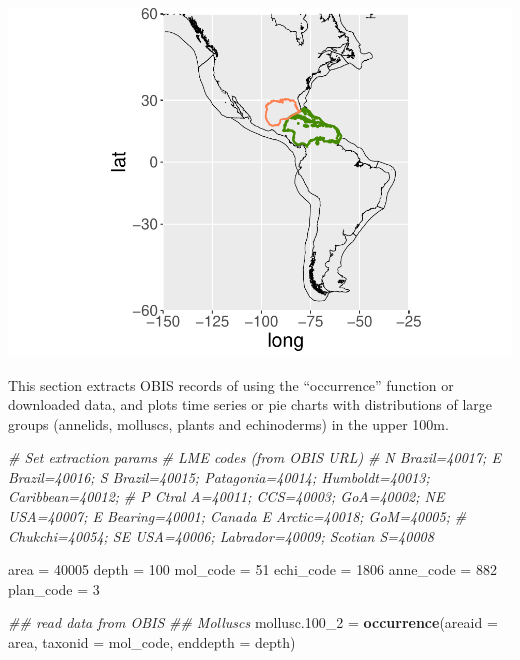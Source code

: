 \documentclass[12pt,]{article}
\newenvironment{Shaded}{\begin{snugshade}}{\end{snugshade}}
\newcommand{\CommentTok}[1]{\textcolor[rgb]{0.56,0.35,0.01}{\textit{#1}}}
\newcommand{\DataTypeTok}[1]{\textcolor[rgb]{0.13,0.29,0.53}{#1}}
\newcommand{\DecValTok}[1]{\textcolor[rgb]{0.00,0.00,0.81}{#1}}
\newcommand{\FloatTok}[1]{\textcolor[rgb]{0.00,0.00,0.81}{#1}}
\newcommand{\KeywordTok}[1]{\textcolor[rgb]{0.13,0.29,0.53}{\textbf{#1}}}
\newcommand{\NormalTok}[1]{#1}
\newcommand{\StringTok}[1]{\textcolor[rgb]{0.31,0.60,0.02}{#1}}
\begin{document}
\includegraphics{lme_extractions_files/figure-latex/unnamed-chunk-4-2.pdf}

This section extracts OBIS records of using the ``occurrence'' function
or downloaded data, and plots time series or pie charts with
distributions of large groups (annelids, molluscs, plants and
echinoderms) in the upper 100m.

\begin{Shaded}
\begin{Highlighting}[]
\CommentTok{# Set extraction params}
\CommentTok{# LME codes (from OBIS URL)}
\CommentTok{# N Brazil=40017; E Brazil=40016; S Brazil=40015; Patagonia=40014; Humboldt=40013; Caribbean=40012; }
\CommentTok{# P Ctral A=40011; CCS=40003; GoA=40002; NE USA=40007; E Bearing=40001; Canada E Arctic=40018; GoM=40005; }
\CommentTok{# Chukchi=40054; SE USA=40006; Labrador=40009; Scotian S=40008}

\NormalTok{area =}\StringTok{ }\DecValTok{40005}  
\NormalTok{depth =}\StringTok{ }\DecValTok{100}
\NormalTok{mol_code =}\StringTok{ }\DecValTok{51}
\NormalTok{echi_code =}\StringTok{ }\DecValTok{1806}
\NormalTok{anne_code =}\StringTok{ }\DecValTok{882}
\NormalTok{plan_code =}\StringTok{ }\DecValTok{3}

\CommentTok{## read data from OBIS}
\CommentTok{## Molluscs}
\NormalTok{mollusc}\FloatTok{.100}\NormalTok{_}\DecValTok{2}\NormalTok{ =}\StringTok{ }\KeywordTok{occurrence}\NormalTok{(}\DataTypeTok{areaid =}\NormalTok{ area, }\DataTypeTok{taxonid =}\NormalTok{ mol_code, }\DataTypeTok{enddepth =}\NormalTok{ depth) }
\end{Highlighting}
\end{Shaded}
\end{document}
